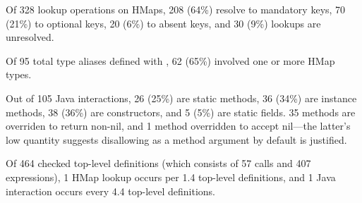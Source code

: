 

Of 328 lookup operations on HMaps,
208 (64\%) resolve to mandatory keys,
70 (21\%) to optional keys,
20 (6\%) to absent keys, and
30 (9\%) lookups are unresolved.

Of 95 total type aliases defined with ,
62 (65\%) involved one or more HMap types.








Out of 105 Java interactions, 26 (25\%) are static methods, 36 (34\%)
are instance methods, 38 (36\%) are constructors, and 5 (5\%) are static
fields. 35 methods are overriden to return non-nil, and 1 method 
overridden to accept nil---the latter's low quantity suggests
\coretyped{} disallowing  as a method argument by default
is justified.

Of 464 checked top-level definitions (which consists of
57  calls and 407  expressions),
1 HMap lookup occurs per 1.4 top-level definitions,
and 1 Java interaction occurs every 4.4 top-level definitions.

